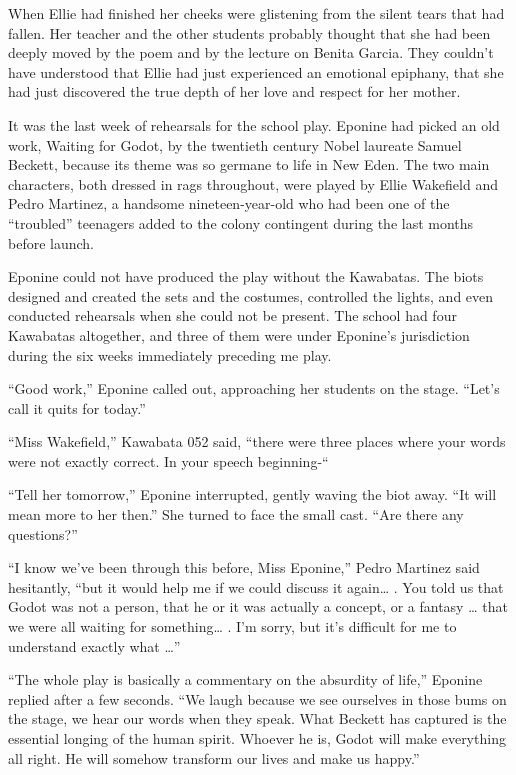 \documentclass[]{article}
\begin{document}
{When Ellie had finished her cheeks were glistening from the silent tears that had fallen. Her teacher and the other students probably thought that she had been deeply moved by the poem and by the lecture on Benita Garcia. They couldn’t have understood that Ellie had just experienced an emotional epiphany, that she had just discovered the true depth of her love and respect for her mother.

It was the last week of rehearsals for the school play. Eponine had picked an old work, Waiting for Godot, by the twentieth century Nobel laureate Samuel Beckett, because its theme was so germane to life in New Eden. The two main characters, both dressed in rags throughout, were played by Ellie Wakefield and Pedro Martinez, a handsome nineteen-year-old who had been one of the “troubled” teenagers added to the colony contingent during the last months before launch.

Eponine could not have produced the play without the Kawabatas. The biots designed and created the sets and the costumes, controlled the lights, and even conducted rehearsals when she could not be present. The school had four Kawabatas altogether, and three of them were under Eponine’s jurisdiction during the six weeks immediately preceding me play.

“Good work,” Eponine called out, approaching her students on the stage. “Let’s call it quits for today.”

“Miss Wakefield,” Kawabata 052 said, “there were three places where your words were not exactly correct. In your speech beginning-“

“Tell her tomorrow,” Eponine interrupted, gently waving the biot away. “It will mean more to her then.” She turned to face the small cast. “Are there any questions?”

“I know we’ve been through this before, Miss Eponine,” Pedro Martinez said hesitantly, “but it would help me if we could discuss it again… . You told us that Godot was not a person, that he or it was actually a concept, or a fantasy … that we were all waiting for something… . I’m sorry, but it’s difficult for me to understand exactly what …”

“The whole play is basically a commentary on the absurdity of life,” Eponine replied after a few seconds. “We laugh because we see ourselves in those bums on the stage, we hear our words when they speak. What Beckett has captured is the essential longing of the human spirit. Whoever he is, Godot will make everything all right. He will somehow transform our lives and make us happy.”

}
\end{document}
